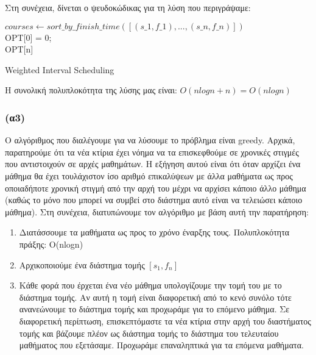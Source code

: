\documentclass[a4paper,oneside, 11pt]{article}
\begin{document}
Στη συνέχεια, δίνεται ο ψευδοκώδικας για τη λύση που περιγράψαμε: \par
{\centering
\begin{minipage}{.7\linewidth}
\begin{algorithm}[H]
	\DontPrintSemicolon
	\bigbreak 
	$courses \gets sort\_by\_finish\_time([(s\_1, f\_1), ..., (s\_n, f\_n)])$ \\
	OPT[0] = 0; \\
	\Return OPT[n] 	
	\bigbreak
	\caption{{Weighted Interval Scheduling}}
\end{algorithm}
\end{minipage}
\par
}
\bigbreak
Η συνολική πολυπλοκότητα της λύσης μας είναι: $O(nlogn + n) = O(nlogn)$


\subsubsection*{(α3)}

Ο αλγόριθμος που διαλέγουμε για να λύσουμε το πρόβλημα είναι greedy. Αρχικά, παρατηρούμε ότι τα νέα κτίρια έχει νόημα να τα επισκεφθούμε σε χρονικές στιγμές που αντιστοιχούν σε αρχές μαθημάτων. Η εξήγηση αυτού είναι ότι όταν αρχίζει ένα μάθημα θα έχει τουλάχιστον ίσο αριθμό επικαλύψεων με άλλα μαθήματα ως προς οποιαδήποτε χρονική στιγμή από την αρχή του μέχρι να αρχίσει κάποιο άλλο μάθημα (καθώς το μόνο που μπορεί να συμβεί στο διάστημα αυτό είναι να τελειώσει κάποιο μάθημα). Στη συνέχεια, διατυπώνουμε τον αλγόριθμο με βάση αυτή την παρατήρηση:
\begin{enumerate}
	\item Διατάσσουμε τα μαθήματα ως προς το χρόνο έναρξης τους. Πολυπλοκότητα πράξης: O(nlogn)
	\item Αρχικοποιούμε ένα διάστημα τομής $[s_1, f_n]$
	\item Κάθε φορά που έρχεται ένα νέο μάθημα υπολογίζουμε την τομή του με το διάστημα τομής. Αν αυτή η τομή είναι διαφορετική από το κενό συνόλο τότε ανανεώνουμε το διάστημα τομής και προχωράμε για το επόμενο μάθημα. Σε διαφορετική περίπτωση, επισκεπτόμαστε τα νέα κτίρια στην αρχή του διαστήματος τομής και βάζουμε πλέον ως διάστημα τομής το διάστημα του τελευταίου μαθήματος που εξετάσαμε. Προχωράμε επαναληπτικά για τα επόμενα μαθήματα.
\end{enumerate}
\end{document}
